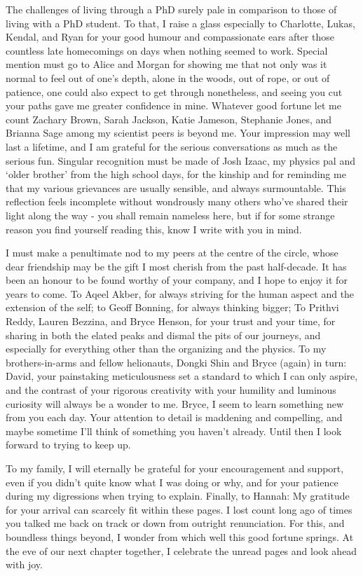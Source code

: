 The challenges of living through a PhD surely pale in comparison to those of living with a PhD student.
To that, I raise a glass especially to Charlotte, Lukas, Kendal, and Ryan for your good humour and compassionate ears after those countless late homecomings on days when nothing seemed to work.
Special mention must go to Alice and Morgan for showing me that not only was it normal to feel out of one's depth, alone in the woods, out of rope, or out of patience, one could also expect to get through nonetheless, and seeing you cut your paths gave me greater confidence in mine.
Whatever good fortune let me count Zachary Brown, Sarah Jackson, Katie Jameson, Stephanie Jones, and Brianna Sage among my scientist peers is beyond me. Your impression may well last a lifetime, and I am grateful for the serious conversations as much as the serious fun. Singular recognition must be made of Josh Izaac, my physics pal and `older brother' from the high school days, for the kinship and for reminding me that my various grievances are usually sensible, and always surmountable. This reflection feels incomplete without wondrously many others who've shared their light along the way - you shall remain nameless here, but if for some strange reason you find yourself reading this, know I write with you in mind.

I must make a penultimate nod to my peers at the centre of the circle,  whose dear friendship may be the gift I most cherish from the past half-decade. It has been an honour to be found worthy of your company, and I hope to enjoy it for years to come.
To Aqeel Akber, for always striving for the human aspect and the extension of the self; to Geoff Bonning, for always thinking bigger; To Prithvi Reddy, Lauren Bezzina, and Bryce Henson, for your trust and your time, for sharing in both the elated peaks and dismal the pits of our journeys, and especially for everything other than the organizing and the physics. 
To my brothers-in-arms and fellow helionauts, Dongki Shin and Bryce (again) in turn: David, your painstaking meticulousness set a standard to which I can only aspire, and the contrast of your rigorous creativity with your humility and luminous curiosity will always be a wonder to me. Bryce, I seem to learn something new from you each day.  Your attention to detail is maddening and compelling, and maybe sometime I'll think of something you haven't already. Until then I look forward to trying to keep up. 

To my family, I will eternally be grateful for your encouragement and support, even if you didn't quite know what I was doing or why, and for your patience during my digressions when trying to explain. Finally, to Hannah: My gratitude for your arrival can scarcely fit within these pages. I lost count long ago of times you talked me back on track or down from outright renunciation. For this, and boundless things beyond, I wonder from which well this good fortune springs. At the eve of our next chapter together, I celebrate the unread pages and look ahead with joy.



\newpage
